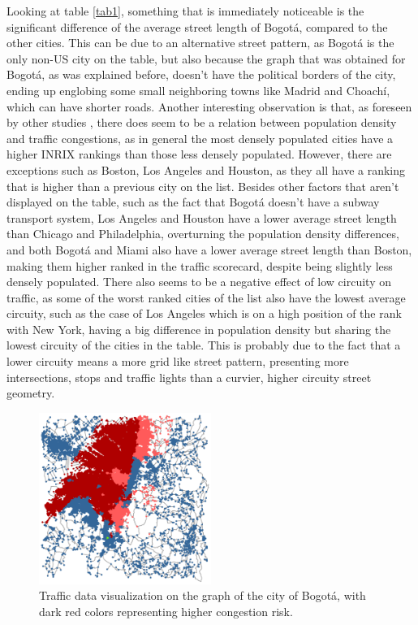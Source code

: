 \documentclass[runningheads]{llncs}
\begin{document}
Looking at table \ref{tab1}, something that is immediately noticeable is the significant difference of the average street length of Bogotá, compared to the other cities. This can be due to an alternative street pattern, as Bogotá is the only non-US city on the table, but also because the graph that was obtained for Bogotá, as was explained before, doesn't have the political borders of the city, ending up englobing some small neighboring towns like Madrid and Choachí, which can have shorter roads. Another interesting observation is that, as foreseen by other studies \cite{levinson_network_2012} \cite{louf_how_2014}, there does seem to be a relation between population density and traffic congestions, as in general the most densely populated cities have a higher INRIX rankings than those less densely populated. However, there are exceptions such as Boston, Los Angeles and Houston, as they all have a ranking that is higher than a previous city on the list. Besides other factors that aren't displayed on the table, such as the fact that Bogotá doesn't have a subway transport system, Los Angeles and Houston have a lower average street length than Chicago and Philadelphia, overturning the population density differences, and both Bogotá and Miami also have a lower average street length than Boston, making them higher ranked in the traffic scorecard, despite being slightly less densely populated. There also seems to be a negative effect of low circuity on traffic, as some of the worst ranked cities of the list also have the lowest average circuity, such as the case of Los Angeles which is on a high position of the rank with New York, having a big difference in population density but sharing the lowest circuity of the cities in the table. This is probably due to the fact that a lower circuity means a more grid like street pattern, presenting more intersections, stops and traffic lights than a curvier, higher circuity street geometry.

\begin{figure}[h]
	\centering
	\includegraphics[width=0.5\textwidth]{Images/GrafoBogotaTrafico}
	\caption{Traffic data visualization on the graph of the city of Bogotá, with dark red colors representing higher congestion risk.}
    \label{fig:Traffic}
\end{figure}
\end{document}
